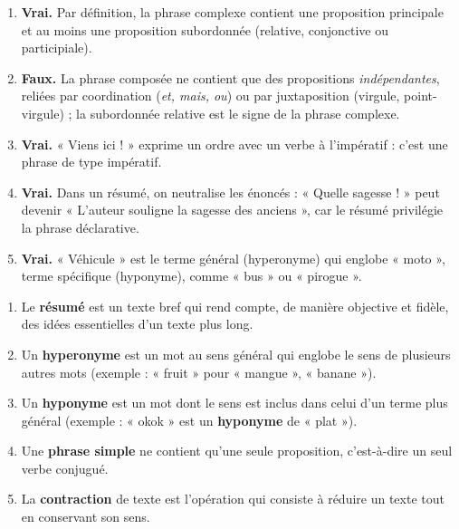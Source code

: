 \documentclass[11pt]{article}
\begin{document}
\begin{corrige}
\begin{enumerate}
\item \textbf{Vrai.} Par définition, la phrase complexe contient une proposition principale et au moins une proposition subordonnée (relative, conjonctive ou participiale).
\item \textbf{Faux.} La phrase composée ne contient que des propositions \emph{indépendantes}, reliées par coordination (\emph{et, mais, ou}) ou par juxtaposition (virgule, point-virgule) ; la subordonnée relative est le signe de la phrase complexe.
\item \textbf{Vrai.} « Viens ici ! » exprime un ordre avec un verbe à l'impératif : c'est une phrase de type impératif.
\item \textbf{Vrai.} Dans un résumé, on neutralise les énoncés : « Quelle sagesse ! » peut devenir « L'auteur souligne la sagesse des anciens », car le résumé privilégie la phrase déclarative.
\item \textbf{Vrai.} « Véhicule » est le terme général (hyperonyme) qui englobe « moto », terme spécifique (hyponyme), comme « bus » ou « pirogue ».
\end{enumerate}
\end{corrige}

\begin{corrige}
\begin{enumerate}
\item Le \textbf{résumé} est un texte bref qui rend compte, de manière objective et fidèle, des idées essentielles d'un texte plus long.
\item Un \textbf{hyperonyme} est un mot au sens général qui englobe le sens de plusieurs autres mots (exemple : « fruit » pour « mangue », « banane »).
\item Un \textbf{hyponyme} est un mot dont le sens est inclus dans celui d'un terme plus général (exemple : « okok » est un \textbf{hyponyme} de « plat »).
\item Une \textbf{phrase simple} ne contient qu'une seule proposition, c'est-à-dire un seul verbe conjugué.
\item La \textbf{contraction} de texte est l'opération qui consiste à réduire un texte tout en conservant son sens.
\end{enumerate}
\end{corrige}
\end{document}
